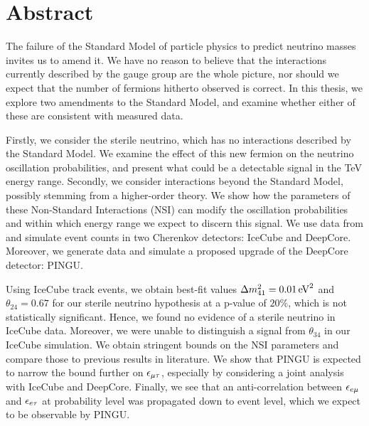 \chapter*{Abstract}

The failure of the Standard Model of particle physics to predict neutrino masses invites us to amend it. We have no reason to believe that 
the interactions currently described by the gauge group are the whole picture, nor should we expect that the number of fermions hitherto observed is correct.
In this thesis, we explore two amendments to the Standard Model, and examine whether either of these are consistent with measured data.

Firstly, we consider the sterile neutrino, which has no interactions described by the Standard Model. We examine the effect of this 
new fermion on the neutrino oscillation probabilities, and present what could be a detectable signal in the \si{\TeV} energy range.
Secondly, we consider interactions beyond the Standard Model, possibly stemming from a higher-order theory.
We show how the parameters of these Non-Standard Interactions (NSI) can modify the oscillation probabilities and within which energy range we expect to discern this signal.
We use data from and simulate event counts in two Cherenkov detectors: IceCube and DeepCore. Moreover, we generate data and simulate a proposed upgrade of the DeepCore detector: PINGU. 

Using IceCube track events, we obtain best-fit values $\dm[41] = \SI{0.01}{\eV^2}$ and $\theta_{24} = 0.67$ for our sterile neutrino hypothesis at 
a p-value of $20\%$, which is not statistically significant. Hence, we found no evidence of a sterile neutrino in IceCube data. 
Moreover, we were unable to distinguish a signal from $\theta_{34}$ in our IceCube simulation.
We obtain stringent bounds on the NSI parameters and compare those to previous results in literature. We show that PINGU is expected to narrow the bound further 
on $\epsilon_{\mu\tau}$, especially by considering a joint analysis with IceCube and DeepCore. Finally, we see that an anti-correlation between 
$\epsilon_{e\mu}$ and $\epsilon_{e\tau}$ at probability level was propagated down to event level, which we expect to be observable by PINGU.


